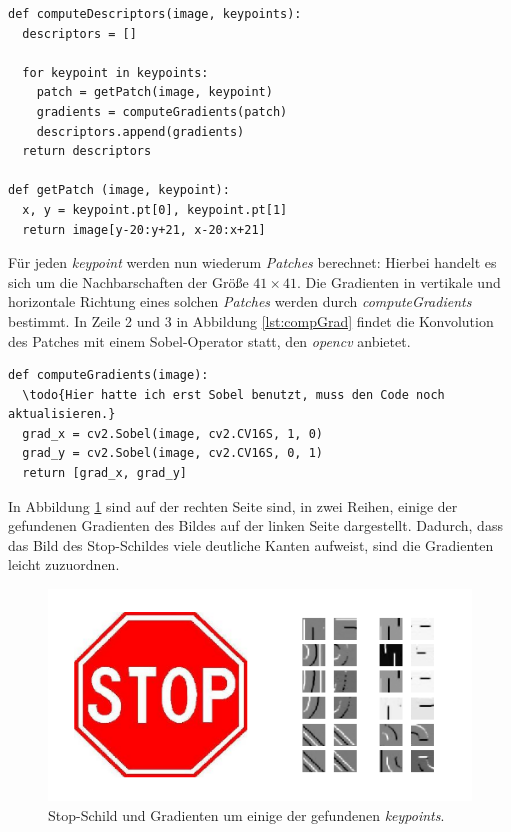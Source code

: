 \lstset{language=Python}
\begin{lstlisting}
def computeDescriptors(image, keypoints):
  descriptors = []
  
  for keypoint in keypoints:
  	patch = getPatch(image, keypoint)
  	gradients = computeGradients(patch)
  	descriptors.append(gradients)
  return descriptors
  
def getPatch (image, keypoint):
  x, y = keypoint.pt[0], keypoint.pt[1]
  return image[y-20:y+21, x-20:x+21]
\end{lstlisting}

Für jeden \textit{keypoint} werden nun wiederum \textit{Patches} berechnet: Hierbei handelt es sich um die Nachbarschaften der Größe $41 \times 41$. Die Gradienten in vertikale und horizontale Richtung eines solchen \textit{Patches} werden durch \textit{computeGradients} bestimmt. In Zeile 2 und 3 in Abbildung \ref{lst:compGrad} findet die Konvolution des Patches mit einem Sobel-Operator statt, den \textit{opencv} anbietet.

\begin{lstlisting}
def computeGradients(image):
  \todo{Hier hatte ich erst Sobel benutzt, muss den Code noch aktualisieren.}
  grad_x = cv2.Sobel(image, cv2.CV16S, 1, 0)
  grad_y = cv2.Sobel(image, cv2.CV16S, 0, 1)
  return [grad_x, grad_y]
\end{lstlisting}

In Abbildung \ref{img:gradients} sind auf der rechten Seite sind, in zwei Reihen, einige der gefundenen Gradienten des Bildes auf der linken Seite dargestellt. Dadurch, dass das Bild des Stop-Schildes viele deutliche Kanten aufweist, sind die Gradienten leicht zuzuordnen.

\begin{figure}
	\centering
	\includegraphics[scale=0.65]{images/gradients_patch.png}
	\caption{Stop-Schild und Gradienten um einige der gefundenen \textit{keypoints}.}
	\label{img:gradients}
\end{figure}

